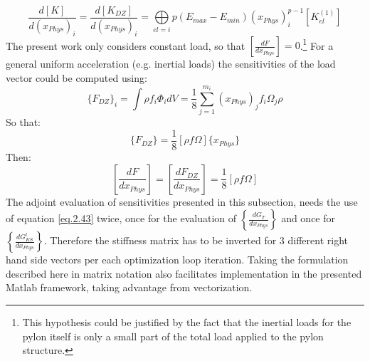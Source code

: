   \begin{equation}
  \frac{d\left[K\right]}{d(x_{Phys})_i}=\frac{d\left[K_{DZ}\right]}{d(x_{Phys})_i}=\underset{el=i}{\bigoplus}{p(E_{max}-E_{min})(x_{Phys})_i^{p-1}\left[K_{el}^{(1)}\right]}
  \end{equation}
 The present work only considers constant load, so that $\left[\frac{dF}{dx_{Phys}}\right]=0$.\footnote{This hypothesis could be justified by the fact that the inertial loads for the pylon itself is only a small part of the total load applied to the pylon structure.}
 For a general uniform acceleration (e.g. inertial loads) the sensitivities of the load vector could be computed using:
 \begin{equation}
 \lbrace F_{DZ} \rbrace_i = \int \rho  f_i  \Phi_i dV=\frac{1}{8}\sum\limits_{j=1}^{m_i}(x_{Phys})_jf_i\Omega_j\rho
 \end{equation}
 So that:
 \begin{equation}
 \lbrace F_{DZ}\rbrace=\frac{1}{8}\left[\rho f\Omega \right]\lbrace x_{Phys} \rbrace
 \end{equation}
 Then:
 \begin{equation}
 \left[\frac{dF}{dx_{Phys}}\right]=\left[\frac{dF_{DZ}}{dx_{Phys}}\right]=\frac{1}{8}\left[\rho f \Omega\right]
 \end{equation}
   The adjoint evaluation of sensitivities presented in this subsection, needs the use of equation \eqref{eq.2.43} twice, once for the evaluation of $\left\lbrace\frac{d G_T}{dx_{Phys}}\right\rbrace$ and once for $\left\lbrace\frac{d G_{KS}^l}{dx_{Phys}}\right\rbrace$.
   Therefore the stiffness matrix has to be inverted for 3 different right hand side vectors per each optimization loop iteration. Taking the formulation described here in matrix notation also facilitates implementation in the presented Matlab framework, taking advantage from vectorization.
